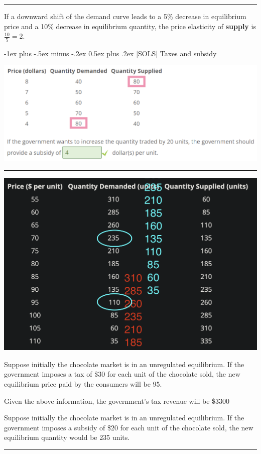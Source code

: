 \documentclass[a4paper]{article}
\makeatletter
\renewcommand{\section}{\@startsection{section}{1}{0mm}%
                                {-1ex plus -.5ex minus -.2ex}%
                                {0.5ex plus .2ex}%
                                {\normalfont\small\bfseries}}
\makeatother
\begin{document}
\begin{multicols*}{3}
        \rule{1\linewidth}{0.4pt}

        If a downward shift of the demand curve leads to a 5\% decrease in equilibrium price and a 10\% decrease in equilibrium quantity, the price elasticity of \textbf{supply} is $\frac{10}{5} = 2$.

    \section{[SOLS] Taxes and subsidy}

    \includegraphics[width=\linewidth]{./tax3.png}

    \rule{1\linewidth}{0.4pt}

    \includegraphics[width=.7\linewidth]{./ts-table.png}

    Suppose initially the chocolate market is in an unregulated equilibrium. If the government imposes a tax of \$30 for each unit of the chocolate sold, the new equilibrium price paid by the consumers will be 95.

    Given the above information, the government’s tax revenue will be \$3300

    Suppose initially the chocolate market is in an unregulated equilibrium. If the government imposes a subsidy of \$20 for each unit of the chocolate sold, the new equilibrium quantity would be 235 units.

    \rule{1\linewidth}{0.4pt}


\end{multicols*}
\end{document}
